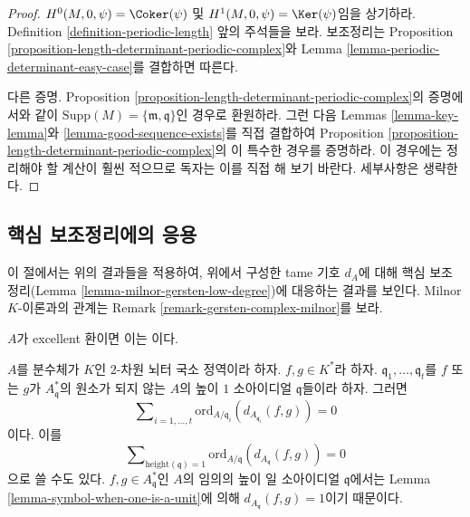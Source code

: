 \begin{proof}
$H^0(M, 0, \psi) = \Coker(\psi)$ 및
$H^1(M, 0, \psi) = \Ker(\psi)$임을 상기하라. Definition
\ref{definition-periodic-length} 앞의 주석들을 보라. 보조정리는
Proposition \ref{proposition-length-determinant-periodic-complex}와
Lemma \ref{lemma-periodic-determinant-easy-case}를 결합하면 따른다.

\medskip\noindent
다른 증명. Proposition
\ref{proposition-length-determinant-periodic-complex}의 증명에서와
같이 $\text{Supp}(M) = \{\mathfrak m, \mathfrak q\}$인 경우로
환원하라. 그런 다음 Lemmas \ref{lemma-key-lemma}와
\ref{lemma-good-sequence-exists}를 직접 결합하여 Proposition
\ref{proposition-length-determinant-periodic-complex}의 이 특수한
경우를 증명하라. 이 경우에는 정리해야 할 계산이 훨씬 적으므로
독자는 이를 직접 해 보기 바란다. 세부사항은 생략한다.
\end{proof}




\subsection{핵심 보조정리에의 응용}
\label{subsection-application-tame-symbol}

\noindent
이 절에서는 위의 결과들을 적용하여, 위에서 구성한 tame 기호 $d_A$에
대해 핵심 보조정리(Lemma \ref{lemma-milnor-gersten-low-degree})에
대응하는 결과를 보인다. Milnor $K$-이론과의 관계는 Remark
\ref{remark-gersten-complex-milnor}를 보라.

\begin{lemma}[핵심 보조정리]
\label{lemma-secondary-ramification}
\begin{reference}
$A$가 excellent 환이면 이는 \cite[Proposition 1]{Kato-Milnor-K}이다.
\end{reference}
$A$를 분수체가 $K$인 $2$-차원 뇌터 국소 정역이라 하자.
$f, g \in K^*$라 하자. $\mathfrak q_1, \ldots, \mathfrak q_t$를
$f$ 또는 $g$가 $A^*_{\mathfrak q}$의 원소가 되지 않는 $A$의
높이 $1$ 소아이디얼 $\mathfrak q$들이라 하자. 그러면
$$
\sum\nolimits_{i = 1, \ldots, t}
\text{ord}_{A/\mathfrak q_i}(d_{A_{\mathfrak q_i}}(f, g))
=
0
$$
이다. 이를
$$
\sum\nolimits_{\text{height}(\mathfrak q) = 1}
\text{ord}_{A/\mathfrak q}(d_{A_{\mathfrak q}}(f, g))
=
0
$$
으로 쓸 수도 있다. $f, g \in A^*_{\mathfrak q}$인 $A$의 임의의
높이 일 소아이디얼 $\mathfrak q$에서는 Lemma
\ref{lemma-symbol-when-one-is-a-unit}에 의해
$d_{A_{\mathfrak q}}(f, g) = 1$이기 때문이다.
\end{lemma}

